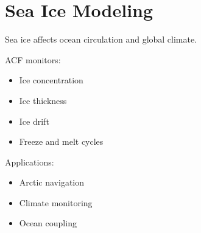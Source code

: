 \section{Sea Ice Modeling}


Sea ice affects ocean circulation and global climate.



ACF monitors:


\begin{itemize}

\item Ice concentration

\item Ice thickness

\item Ice drift

\item Freeze and melt cycles

\end{itemize}



Applications:


\begin{itemize}

\item Arctic navigation

\item Climate monitoring

\item Ocean coupling

\end{itemize}
